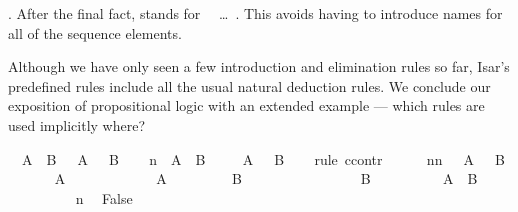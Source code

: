 \begin{isabellebody}
\begin{isamarkuptext}
. After the final fact,  stands
for ~~\dots~.  This avoids having to
introduce names for all of the sequence elements.%
\end{isamarkuptext}%
\isamarkuptrue%
%
\begin{isamarkuptext}%
Although we have only seen a few introduction and elimination rules so
far, Isar's predefined rules include all the usual natural deduction
rules. We conclude our exposition of propositional logic with an extended
example --- which rules are used implicitly where?%
\end{isamarkuptext}%
\isamarkupfalse%
\ {\isachardoublequote}{\isasymnot}\ {\isacharparenleft}A\ {\isasymand}\ B{\isacharparenright}\ {\isasymlongrightarrow}\ {\isasymnot}\ A\ {\isasymor}\ {\isasymnot}\ B{\isachardoublequote}\isanewline
%
\isadelimproof
%
\endisadelimproof
%
\isatagproof
\isamarkupfalse%
\isanewline
\ \ \isamarkupfalse%
\ n{\isacharcolon}\ {\isachardoublequote}{\isasymnot}\ {\isacharparenleft}A\ {\isasymand}\ B{\isacharparenright}{\isachardoublequote}\isanewline
\ \ \isamarkupfalse%
\ {\isachardoublequote}{\isasymnot}\ A\ {\isasymor}\ {\isasymnot}\ B{\isachardoublequote}\isanewline
\ \ \isamarkupfalse%
\ {\isacharparenleft}rule\ ccontr{\isacharparenright}\isanewline
\ \ \ \ \isamarkupfalse%
\ nn{\isacharcolon}\ {\isachardoublequote}{\isasymnot}\ {\isacharparenleft}{\isasymnot}\ A\ {\isasymor}\ {\isasymnot}\ B{\isacharparenright}{\isachardoublequote}\isanewline
\ \ \ \ \isamarkupfalse%
\ {\isachardoublequote}{\isasymnot}\ A{\isachardoublequote}\isanewline
\ \ \ \ \isamarkupfalse%
\isanewline
\ \ \ \ \ \ \isamarkupfalse%
\ {\isachardoublequote}A{\isachardoublequote}\isanewline
\ \ \ \ \ \ \isamarkupfalse%
\ {\isachardoublequote}{\isasymnot}\ B{\isachardoublequote}\isanewline
\ \ \ \ \ \ \isamarkupfalse%
\isanewline
\ \ \ \ \ \ \ \ \isamarkupfalse%
\ {\isachardoublequote}B{\isachardoublequote}\isanewline
\ \ \ \ \ \ \ \ \isamarkupfalse%
\ {\isachardoublequote}A\ {\isasymand}\ B{\isachardoublequote}\ \isamarkupfalse%
\isacommand{{\isachardot}{\isachardot}}\isanewline
\ \ \ \ \ \ \ \ \isamarkupfalse%
\ n\ \isamarkupfalse%
\ False\ \isamarkupfalse%
\isacommand{{\isachardot}{\isachardot}}\isanewline
\ \ \ \ \ \ \isamarkupfalse%
\isanewline

\end{isabellebody}
